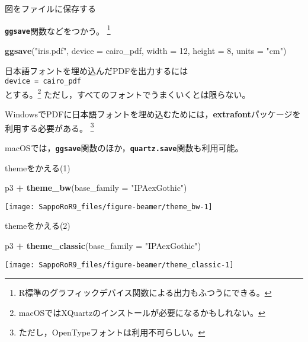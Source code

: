 \documentclass[ignorenonframetext,]{beamer}
\newenvironment{Shaded}{\begin{snugshade}}{\end{snugshade}}
\newcommand{\KeywordTok}[1]{\textcolor[rgb]{0.13,0.29,0.53}{\textbf{#1}}}
\newcommand{\DataTypeTok}[1]{\textcolor[rgb]{0.13,0.29,0.53}{#1}}
\newcommand{\DecValTok}[1]{\textcolor[rgb]{0.00,0.00,0.81}{#1}}
\newcommand{\StringTok}[1]{\textcolor[rgb]{0.31,0.60,0.02}{#1}}
\newcommand{\OperatorTok}[1]{\textcolor[rgb]{0.81,0.36,0.00}{\textbf{#1}}}
\newcommand{\NormalTok}[1]{#1}
\let\oldShaded\Shaded
\let\endoldShaded\endShaded
\renewenvironment{Shaded}{\footnotesize\oldShaded}{\endoldShaded}
\begin{document}
\begin{frame}[fragile]{図をファイルに保存する}

\textbf{\texttt{ggsave}}関数などをつかう。
\footnote{R標準のグラフィックデバイス関数による出力もふつうにできる。}

\begin{Shaded}
\begin{Highlighting}[]
\KeywordTok{ggsave}\NormalTok{(}\StringTok{"iris.pdf"}\NormalTok{, }\DataTypeTok{device =}\NormalTok{ cairo_pdf,}
       \DataTypeTok{width =} \DecValTok{12}\NormalTok{, }\DataTypeTok{height =} \DecValTok{8}\NormalTok{, }\DataTypeTok{units =} \StringTok{"cm"}\NormalTok{)}
\end{Highlighting}
\end{Shaded}

日本語フォントを埋め込んだPDFを出力するには\\
\texttt{device\ =\ cairo\_pdf}\\
とする。\footnote{macOSではXQuartzのインストールが必要になるかもしれない。}
ただし，すべてのフォントでうまくいくとは限らない。

WindowsでPDFに日本語フォントを埋め込むためには，\textbf{extrafont}パッケージを利用する必要がある。
\footnote{ただし，OpenTypeフォントは利用不可らしい。}

\vspace{12pt}

macOSでは，\textbf{\texttt{ggsave}}関数のほか，\textbf{\texttt{quartz.save}}関数も利用可能。

\end{frame}

\begin{frame}[fragile]{themeをかえる(1)}

\begin{Shaded}
\begin{Highlighting}[]
\NormalTok{p3 }\OperatorTok{+}\StringTok{ }\KeywordTok{theme_bw}\NormalTok{(}\DataTypeTok{base_family =} \StringTok{"IPAexGothic"}\NormalTok{)}
\end{Highlighting}
\end{Shaded}

\texttt{[image: SappoRoR9\_files/figure-beamer/theme\_bw-1]}

\end{frame}

\begin{frame}[fragile]{themeをかえる(2)}

\begin{Shaded}
\begin{Highlighting}[]
\NormalTok{p3 }\OperatorTok{+}\StringTok{ }\KeywordTok{theme_classic}\NormalTok{(}\DataTypeTok{base_family =} \StringTok{"IPAexGothic"}\NormalTok{)}
\end{Highlighting}
\end{Shaded}

\texttt{[image: SappoRoR9\_files/figure-beamer/theme\_classic-1]}

\end{frame}
\end{document}
